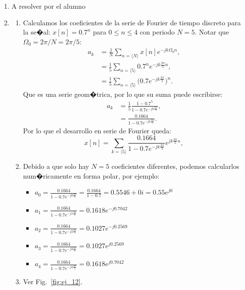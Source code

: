 \documentclass[10pt,a4paper]{article}
\begin{document}
\begin{enumerate}
\item A resolver por el alumno


\item 
\begin{enumerate}
	\item Calculamos los coeficientes de la serie de Fourier de tiempo discreto para la se�al: $x[n]=0.7^n$ para 
	$0\leq n\leq 4$ con periodo $N=5$. Notar que $\Omega_0=2\pi/N=2\pi/5$:
	\begin{align}
	a_k &= \frac{1}{N} \sum_{n=\langle N\rangle} x[n]e^{-jk\Omega_0n},\\
	&= \frac{1}{5} \sum_{n=\langle 5\rangle} 0.7^n e^{-jk\frac{2\pi}{5}n},\\
    &= \frac{1}{5} \sum_{n=\langle 5\rangle} \Big( 0.7 e^{-jk\frac{2\pi}{5}} \Big) ^n.
   	\end{align}
	Que es una serie geom�trica, por lo que su suma puede escribirse:
	\begin{align}
	a_k  &= \frac{1}{5}\frac{1-0.7^5}{1-0.7e^{-jk\frac{2\pi}{5}}},\\
	 &=\boxed{\frac{0.1664}{1-0.7e^{-jk\frac{2\pi}{5}}}}.
	\end{align}	
	 Por lo que el desarrollo en serie de Fourier queda:
	\begin{equation}
	x[n] = \sum_{k=\langle 5\rangle} \frac{0.1664}{1-0.7e^{-jk\frac{2\pi}{5}}} e^{jk\frac{2\pi}{5}n},
	\end{equation}
	\item Debido a que solo hay $N=5$ coeficientes diferentes, podemos calcularlos num�ricamente en forma polar, por 
	ejemplo:
	\begin{itemize}
		\item $a_0=\frac{0.1664}{1-0.7e^{-j0\frac{2\pi}{5}}}=\frac{0.1664}{1-0.7}=0.5546+0i=0.55e^{j0}$
		\item $a_1=\frac{0.1664}{1-0.7e^{-j1\frac{2\pi}{5}}}=0.1618e^{-j0.7042}$
		\item $a_2=\frac{0.1664}{1-0.7e^{-j2\frac{2\pi}{5}}}=0.1027e^{-j0.2569}$
		\item $a_3=\frac{0.1664}{1-0.7e^{-j3\frac{2\pi}{5}}}=0.1027e^{j0.2569}$
		\item $a_4=\frac{0.1664}{1-0.7e^{-j4\frac{2\pi}{5}}}=0.1618e^{j0.7042}$						
	\end{itemize}
	\item Ver Fig.~\ref{fig:ej_12}.

\end{enumerate}
\end{enumerate}
\end{document}
